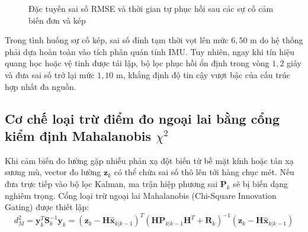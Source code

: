\begin{figure}[H]
\centering
{}
\caption{Đặc tuyến sai số RMSE và thời gian tự phục hồi sau các sự cố cảm biến đơn và kép}
\label{fig:sensor-recovery}
\end{figure}

Trong tình huống sự cố kép, sai số đỉnh tạm thời vọt lên mức $6{,}50$ m do hệ thống phải dựa hoàn toàn vào tích phân quán tính IMU. Tuy nhiên, ngay khi tín hiệu quang học hoặc vệ tinh được tái lập, bộ lọc phục hồi ổn định trong vòng $1{,}2$ giây và đưa sai số trở lại mức $1{,}10$ m, khẳng định độ tin cậy vượt bậc của cấu trúc hợp nhất đa nguồn.

\subsection{Cơ chế loại trừ điểm đo ngoại lai bằng cổng kiểm định Mahalanobis \texorpdfstring{$\chi^2$}{Chi-Square}}

\hspace{0.5cm} Khi cảm biến đo lường gặp nhiễu phản xạ đột biến từ bề mặt kính hoặc tán xạ sương mù, vector đo lường $\mathbf{z}_k$ có thể chứa sai số thô lên tới hàng chục mét. Nếu đưa trực tiếp vào bộ lọc Kalman, ma trận hiệp phương sai $\mathbf{P}_k$ sẽ bị biến dạng nghiêm trọng. Cổng loại trừ ngoại lai Mahalanobis (Chi-Square Innovation Gating) được thiết lập:
\begin{equation}
d_M^2 = \mathbf{y}_k^T \mathbf{S}_k^{-1} \mathbf{y}_k = (\mathbf{z}_k - \mathbf{H}\hat{\mathbf{x}}_{k|k-1})^T (\mathbf{H}\mathbf{P}_{k|k-1}\mathbf{H}^T + \mathbf{R}_k)^{-1} (\mathbf{z}_k - \mathbf{H}\hat{\mathbf{x}}_{k|k-1})
\label{eq:mahalanobis-distance-formula}
\end{equation}

